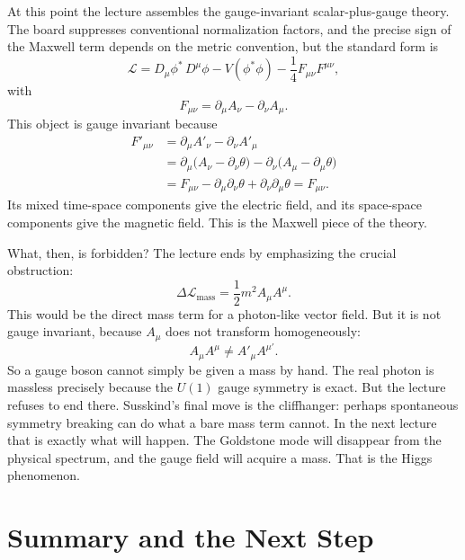 At this point the lecture assembles the gauge-invariant scalar-plus-gauge theory. The board suppresses conventional normalization factors, and the precise sign of the Maxwell term depends on the metric convention, but the standard form is
\begin{equation}
\mathcal{L}
=
D_\mu\phi^*\,D^\mu\phi
-
V(\phi^*\phi)
-
\frac14 F_{\mu\nu}F^{\mu\nu},
\label{eq:gauge-lagrangian}
\end{equation}
with
\begin{equation}
F_{\mu\nu}=\partial_\mu A_\nu-\partial_\nu A_\mu.
\label{eq:field-strength}
\end{equation}
This object is gauge invariant because
\begin{align}
F'_{\mu\nu}
&=
\partial_\mu A'_\nu-\partial_\nu A'_\mu
\nonumber\\
&=
\partial_\mu\big(A_\nu-\partial_\nu\theta\big)
-
\partial_\nu\big(A_\mu-\partial_\mu\theta\big)
\nonumber\\
&=
F_{\mu\nu}
-
\partial_\mu\partial_\nu\theta
+
\partial_\nu\partial_\mu\theta
=
F_{\mu\nu}.
\label{eq:F-invariant}
\end{align}
Its mixed time-space components give the electric field, and its space-space components give the magnetic field. This is the Maxwell piece of the theory.

What, then, is forbidden? The lecture ends by emphasizing the crucial obstruction:
\begin{equation}
\Delta\mathcal{L}_{\text{mass}}
=
\frac12 m^2 A_\mu A^\mu.
\label{eq:forbidden-mass}
\end{equation}
This would be the direct mass term for a photon-like vector field. But it is not gauge invariant, because \(A_\mu\) does not transform homogeneously:
\[
A_\mu A^\mu \neq A'_\mu A^{\mu\prime}.
\]
So a gauge boson cannot simply be given a mass by hand. The real photon is massless precisely because the \(U(1)\) gauge symmetry is exact. But the lecture refuses to end there. Susskind's final move is the cliffhanger: perhaps spontaneous symmetry breaking can do what a bare mass term cannot. In the next lecture that is exactly what will happen. The Goldstone mode will disappear from the physical spectrum, and the gauge field will acquire a mass. That is the Higgs phenomenon.

\section{Summary and the Next Step}


